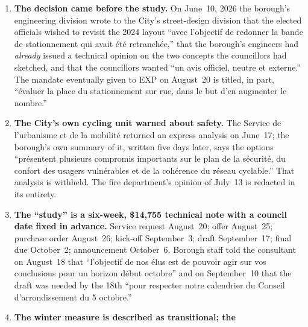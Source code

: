 \documentclass[11pt,letterpaper]{article}
\begin{document}
\begin{enumerate}[nosep]
  \item \begin{minipage}[t]{\linewidth}\textbf{The decision came before the study.} On June~10, 2026 the
    borough's engineering division wrote to the City's street-design
    division that the elected officials wished to revisit the 2024 layout
    ``avec l'objectif de redonner la bande de stationnement qui avait \'et\'e
    retranch\'ee,'' that the borough's engineers had \emph{already} issued a
    technical opinion on the two concepts the councillors had sketched, and
    that the councillors wanted ``un avis officiel, neutre et externe.'' The
    mandate eventually given to EXP on August~20 is titled, in part,
    ``\'evaluer la place du stationnement sur rue, dans le but d'en augmenter
    le nombre.''\end{minipage}\vspace{0.35em}
\item \begin{minipage}[t]{\linewidth}\textbf{The City's own cycling unit warned about safety.} The
    Service de l'urbanisme et de la mobilit\'e returned an express analysis on
    June~17; the borough's own summary of it, written five days later, says
    the options ``pr\'esentent plusieurs compromis importants sur le plan de
    la s\'ecurit\'e, du confort des usagers vuln\'erables et de la coh\'erence
    du r\'eseau cyclable.'' That analysis is withheld. The fire department's
    opinion of July~13 is redacted in its entirety.\end{minipage}\vspace{0.35em}
\item \begin{minipage}[t]{\linewidth}\textbf{The ``study'' is a six-week, \$14{,}755 technical note with a
    council date fixed in advance.} Service request August~20; offer
    August~25; purchase order August~26; kick-off September~3; draft
    September~17; final due October~2; announcement October~6. Borough staff
    told the consultant on August~18 that ``l'objectif de nos \'elus est de
    pouvoir agir sur vos conclusions pour un horizon d\'ebut octobre'' and on
    September~10 that the draft was needed by the 18th ``pour respecter notre
    calendrier du Conseil d'arrondissement du 5 octobre.''\end{minipage}\vspace{0.35em}
\item \begin{minipage}[t]{\linewidth}\textbf{The winter measure is described as transitional; the
}
\end{minipage}
\end{enumerate}
\end{document}
